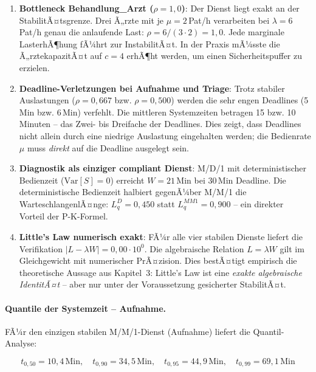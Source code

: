 ﻿\documentclass[a4paper,12pt]{scrreprt}
\theoremstyle{definition}
\begin{document}
\begin{enumerate}
	\item[-] \textbf{Bottleneck Behandlung\_Arzt ($\rho = 1{,}0$)}: Der
	Dienst liegt exakt an der StabilitÃ¤tsgrenze. Drei Ã„rzte mit je
	$\mu = 2$\,Pat/h verarbeiten bei $\lambda = 6$\,Pat/h genau
	die anlaufende Last: $\rho = 6/(3 \cdot 2) = 1{,}0$.
	Jede marginale LasterhÃ¶hung fÃ¼hrt zur InstabilitÃ¤t.
	In der Praxis mÃ¼sste die Ã„rztekapazitÃ¤t auf $c=4$ erhÃ¶ht werden,
	um einen Sicherheitspuffer zu erzielen.
	
	\item[-] \textbf{Deadline-Verletzungen bei Aufnahme und Triage}:
	Trotz stabiler Auslastungen ($\rho = 0{,}667$ bzw. $\rho = 0{,}500$)
	werden die sehr engen Deadlines (5\,Min bzw. 6\,Min) verfehlt.
	Die mittleren Systemzeiten betragen 15 bzw. 10\,Minuten --
	das Zwei- bis Dreifache der Deadlines. Dies zeigt, dass Deadlines
	nicht allein durch eine niedrige Auslastung eingehalten werden;
	die Bedienrate $\mu$ muss \emph{direkt} auf die Deadline ausgelegt sein.
	
	\item[-] \textbf{Diagnostik als einziger compliant Dienst}: M/D/1
	mit deterministischer Bedienzeit ($\mathrm{Var}[S]=0$) erreicht
	$W = 21$\,Min bei 30\,Min Deadline. Die deterministische Bedienzeit
	halbiert gegenÃ¼ber M/M/1 die WarteschlangenlÃ¤nge:
	$L_q^{D} = 0{,}450$ statt $L_q^{MM1} = 0{,}900$ -- ein direkter
	Vorteil der P-K-Formel.
	
	\item[-] \textbf{Little's Law numerisch exakt}:
	FÃ¼r alle vier stabilen Dienste liefert die Verifikation
	$|L - \lambda W| = 0{,}00 \cdot 10^0$. Die algebraische
	Relation $L = \lambda W$ gilt im Gleichgewicht mit numerischer
	PrÃ¤zision. Dies bestÃ¤tigt empirisch die theoretische Aussage aus
	Kapitel~3: Little's Law ist eine \emph{exakte algebraische IdentitÃ¤t}
	-- aber nur unter der Voraussetzung gesicherter StabilitÃ¤t.
\end{enumerate}

\paragraph{Quantile der Systemzeit -- Aufnahme.}
FÃ¼r den einzigen stabilen M/M/1-Dienst (Aufnahme) liefert die Quantil-Analyse:

\begin{equation}
	t_{0{,}50} = 10{,}4\,\text{Min}, \quad
	t_{0{,}90} = 34{,}5\,\text{Min}, \quad
	t_{0{,}95} = 44{,}9\,\text{Min}, \quad
	t_{0{,}99} = 69{,}1\,\text{Min}
\end{equation}
\end{document}
